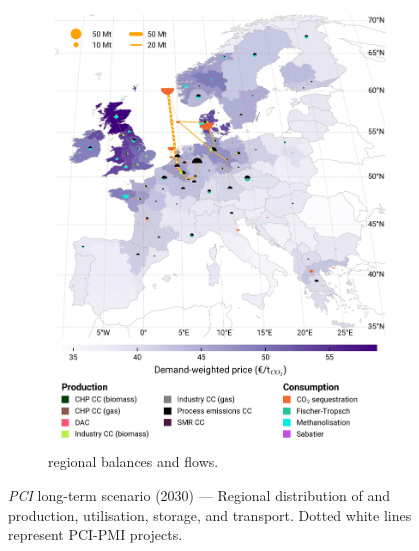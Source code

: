 \documentclass[preprint,12pt,sort&compress]{elsarticle}
\begin{document}
\begin{figure}[htbp]
\begin{subfigure}[t]{0.49\textwidth}
      \includegraphics[width=1\textwidth]{maps/pcipmi-national-international-expansion/base_s_adm___2030-balance_map_co2_stored} 
      \vspace{-0.7cm}
      \caption{ regional balances and flows.}
      \label{fig:PCI-in_lt_2030_co2}
  \end{subfigure}
  \caption{\textit{PCI} long-term scenario (2030) --- Regional distribution of  and  production, utilisation, storage, and transport. Dotted white lines represent PCI-PMI projects.}
  \label{fig:PCI-in_lt_2030}
\end{figure}
\end{document}
